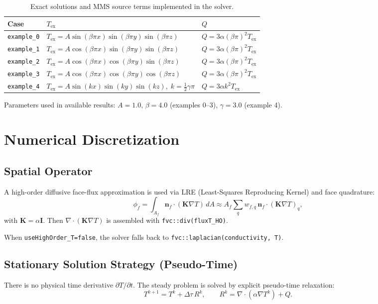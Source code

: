 \documentclass[11pt,a4paper]{article}
\begin{document}
\begin{table}[htbp]
\centering
\caption{Exact solutions and MMS source terms implemented in the solver.}
\label{tab:mms-defs}
\small
\begin{tabular}{lll}
\toprule
Case & $T_{\mathrm{ex}}$ & $Q$ \\
\midrule
\texttt{example\_0} & $T_{\mathrm{ex}} = A\sin(\beta\pi x)\sin(\beta\pi y)\sin(\beta\pi z)$ & $Q = 3\alpha(\beta\pi)^2 T_{\mathrm{ex}}$ \\
\texttt{example\_1} & $T_{\mathrm{ex}} = A\cos(\beta\pi x)\sin(\beta\pi y)\sin(\beta\pi z)$ & $Q = 3\alpha(\beta\pi)^2 T_{\mathrm{ex}}$ \\
\texttt{example\_2} & $T_{\mathrm{ex}} = A\cos(\beta\pi x)\cos(\beta\pi y)\sin(\beta\pi z)$ & $Q = 3\alpha(\beta\pi)^2 T_{\mathrm{ex}}$ \\
\texttt{example\_3} & $T_{\mathrm{ex}} = A\cos(\beta\pi x)\cos(\beta\pi y)\cos(\beta\pi z)$ & $Q = 3\alpha(\beta\pi)^2 T_{\mathrm{ex}}$ \\
\texttt{example\_4} & $T_{\mathrm{ex}} = A\sin(kx)\sin(ky)\sin(kz),\; k=\tfrac{1}{2}\gamma\pi$ & $Q = 3\alpha k^2 T_{\mathrm{ex}}$ \\
\bottomrule
\end{tabular}
\end{table}

Parameters used in available results: $A=1.0$, $\beta=4.0$ (examples 0--3), $\gamma=3.0$ (example 4).

\section{Numerical Discretization}
\subsection{Spatial Operator}
A high-order diffusive face-flux approximation is used via LRE (Least-Squares Reproducing Kernel) and face quadrature:
\begin{equation}
\phi_f = \int_{A_f} \mathbf{n}_f\cdot(\mathbf{K}\nabla T)\,dA \approx A_f\sum_q w_{f,q}\,\mathbf{n}_f\cdot(\mathbf{K}\nabla T)_q,
\end{equation}
with $\mathbf{K}=\alpha\mathbf{I}$. Then $\nabla\cdot(\mathbf{K}\nabla T)$ is assembled with \texttt{fvc::div(fluxT\_HO)}.

When \texttt{useHighOrder\_T=false}, the solver falls back to \texttt{fvc::laplacian(conductivity, T)}.

\subsection{Stationary Solution Strategy (Pseudo-Time)}
There is no physical time derivative $\partial T/\partial t$. The steady problem is solved by explicit pseudo-time relaxation:
\begin{equation}
T^{k+1} = T^k + \Delta\tau\,R^k, \qquad R^k = \nabla\cdot(\alpha\nabla T^k)+Q.
\end{equation}
\end{document}
